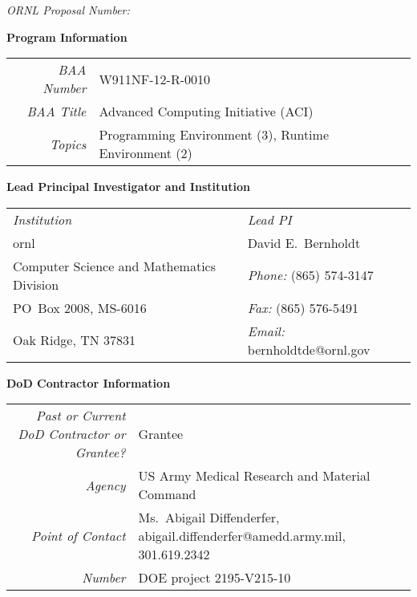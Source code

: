 \vfill
\begin{center}
\textbf{ \huge
\proposaltitle{}
}
\end{center}

\bigskip

\begin{center}
\emph{ORNL Proposal Number:} \proposalnumber{}
\end{center}

\bigskip

\begin{center}
\textbf{\large Program Information} \\
\smallskip
\begin{tabular}{rl}
\emph{BAA Number} & W911NF-12-R-0010 \\
\emph{BAA Title}  & Advanced Computing Initiative (ACI)
\smallskip \\
\emph{Topics} & Programming Environment (3), Runtime Environment (2) \\
\end{tabular}

\end{center}

\vfill

\begin{center}
\textbf{\large Lead Principal Investigator and Institution} \\
\smallskip
\begin{tabular}{ll}
\emph{Institution} & \emph{Lead PI} \\
\acl{ornl}                & David E.~Bernholdt \\
Computer Science and Mathematics Division & \emph{Phone:} (865) 574-3147 \\
PO~Box 2008, MS-6016           & \emph{Fax:} (865) 576-5491 \\
Oak Ridge, TN 37831       & \emph{Email:} bernholdtde@ornl.gov \\
\end{tabular}

\end{center}

\vfill

\begin{center}
\textbf{\large DoD Contractor Information} \\
\smallskip
\begin{tabularx}{\columnwidth}{r>{\raggedright\arraybackslash}X}
\emph{Past or Current DoD Contractor or Grantee?} & Grantee \\
\emph{Agency} & US Army Medical Research and Material Command \\
\emph{Point of Contact} & Ms.~Abigail Diffenderfer,
abigail.diffenderfer@amedd.army.mil, 301.619.2342 \\
\emph{Number} & DOE project 2195-V215-10 \\
\end{tabularx}
\end{center}

\vfill


